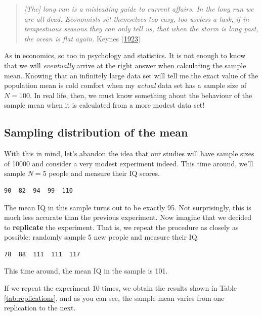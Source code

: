 \documentclass[
]{book}
\theoremstyle{definition}
\theoremstyle{definition}
\theoremstyle{definition}
\theoremstyle{definition}
\theoremstyle{remark}
\begin{document}
\begin{quote}
\emph{{[}The{]} long run is a misleading guide to current affairs. In the long run we are all dead. Economists set themselves too easy, too useless a task, if in tempestuous seasons they can only tell us, that when the storm is long past, the ocean is flat again.} Keynes (\protect\hyperlink{ref-Keynes1923}{1923})
\end{quote}

As in economics, so too in psychology and statistics. It is not enough to know that we will \emph{eventually} arrive at the right answer when calculating the sample mean. Knowing that an infinitely large data set will tell me the exact value of the population mean is cold comfort when my \emph{actual} data set has a sample size of \(N=100\). In real life, then, we must know something about the behaviour of the sample mean when it is calculated from a more modest data set!

\hypertarget{samplingdists}{%
\subsection{Sampling distribution of the mean}\label{samplingdists}}

With this in mind, let's abandon the idea that our studies will have sample sizes of 10000 and consider a very modest experiment indeed. This time around, we'll sample \(N=5\) people and measure their IQ scores.

\begin{verbatim}
90  82  94  99  110
\end{verbatim}

The mean IQ in this sample turns out to be exactly 95. Not surprisingly, this is much less accurate than the previous experiment. Now imagine that we decided to \textbf{replicate} the experiment. That is, we repeat the procedure as closely as possible: randomly sample 5 new people and measure their IQ.

\begin{verbatim}
78  88  111  111  117
\end{verbatim}

This time around, the mean IQ in the sample is 101.

If we repeat the experiment 10 times, we obtain the results shown in Table \ref{tab:replications}, and as you can see, the sample mean varies from one replication to the next.
\end{document}
